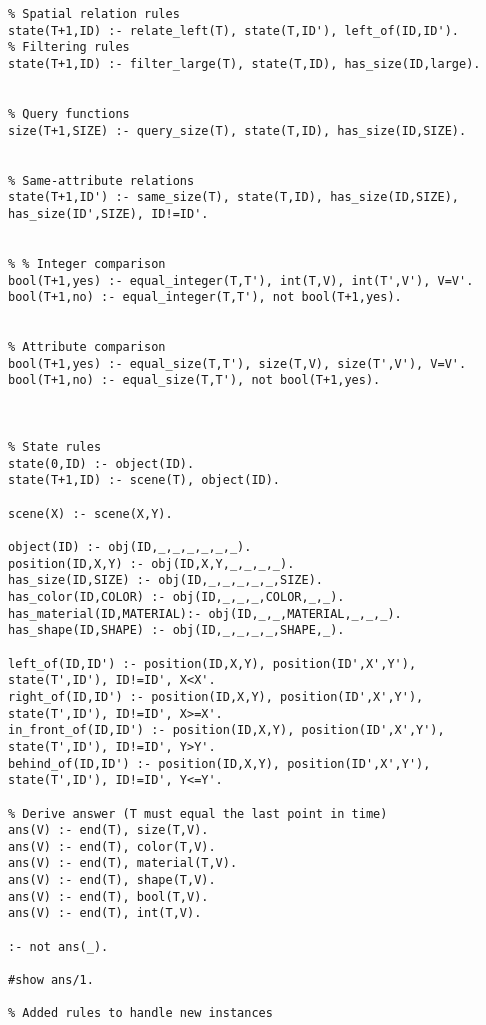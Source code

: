 \begin{lstlisting}
% Spatial relation rules
state(T+1,ID) :- relate_left(T), state(T,ID'), left_of(ID,ID').
% Filtering rules
state(T+1,ID) :- filter_large(T), state(T,ID), has_size(ID,large).


% Query functions
size(T+1,SIZE) :- query_size(T), state(T,ID), has_size(ID,SIZE).


% Same-attribute relations
state(T+1,ID') :- same_size(T), state(T,ID), has_size(ID,SIZE), has_size(ID',SIZE), ID!=ID'.


% % Integer comparison
bool(T+1,yes) :- equal_integer(T,T'), int(T,V), int(T',V'), V=V'.
bool(T+1,no) :- equal_integer(T,T'), not bool(T+1,yes).


% Attribute comparison
bool(T+1,yes) :- equal_size(T,T'), size(T,V), size(T',V'), V=V'.
bool(T+1,no) :- equal_size(T,T'), not bool(T+1,yes).



% State rules
state(0,ID) :- object(ID).
state(T+1,ID) :- scene(T), object(ID).

scene(X) :- scene(X,Y).

object(ID) :- obj(ID,_,_,_,_,_,_).
position(ID,X,Y) :- obj(ID,X,Y,_,_,_,_).
has_size(ID,SIZE) :- obj(ID,_,_,_,_,_,SIZE).
has_color(ID,COLOR) :- obj(ID,_,_,_,COLOR,_,_).
has_material(ID,MATERIAL):- obj(ID,_,_,MATERIAL,_,_,_).
has_shape(ID,SHAPE) :- obj(ID,_,_,_,_,SHAPE,_).

left_of(ID,ID') :- position(ID,X,Y), position(ID',X',Y'), state(T',ID'), ID!=ID', X<X'.
right_of(ID,ID') :- position(ID,X,Y), position(ID',X',Y'), state(T',ID'), ID!=ID', X>=X'.
in_front_of(ID,ID') :- position(ID,X,Y), position(ID',X',Y'), state(T',ID'), ID!=ID', Y>Y'.
behind_of(ID,ID') :- position(ID,X,Y), position(ID',X',Y'), state(T',ID'), ID!=ID', Y<=Y'.

% Derive answer (T must equal the last point in time)
ans(V) :- end(T), size(T,V).
ans(V) :- end(T), color(T,V).
ans(V) :- end(T), material(T,V).
ans(V) :- end(T), shape(T,V).
ans(V) :- end(T), bool(T,V).
ans(V) :- end(T), int(T,V).

:- not ans(_).

#show ans/1.

% Added rules to handle new instances
\end{lstlisting}

